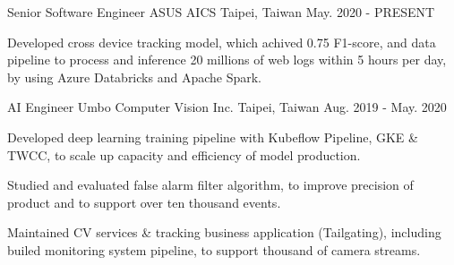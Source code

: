 

\begin{cventries}

  \cventry
    {Senior Software Engineer} %
    {ASUS AICS} %
    {Taipei, Taiwan} %
    {May. 2020 - PRESENT} %
    {
      \begin{cvitems} %
        \item {Developed cross device tracking model, which achived 0.75 F1-score, and data pipeline to process and inference 20 millions of web logs within 5 hours per day, by using Azure Databricks and Apache Spark.}
      \end{cvitems}
    }

  \cventry
    {AI Engineer} %
    {Umbo Computer Vision Inc.} %
    {Taipei, Taiwan} %
    {Aug. 2019 - May. 2020} %
    {
      \begin{cvitems} %
        \item {Developed deep learning training pipeline with Kubeflow Pipeline, GKE \& TWCC, to scale up capacity and efficiency of model production.}
        \item {Studied and evaluated false alarm filter algorithm, to improve precision of product and to support over ten thousand events.}
        \item {Maintained CV services \& tracking business application (Tailgating), including builed monitoring system pipeline, to support thousand of camera streams.}
      \end{cvitems}
    }


\end{cventries}
